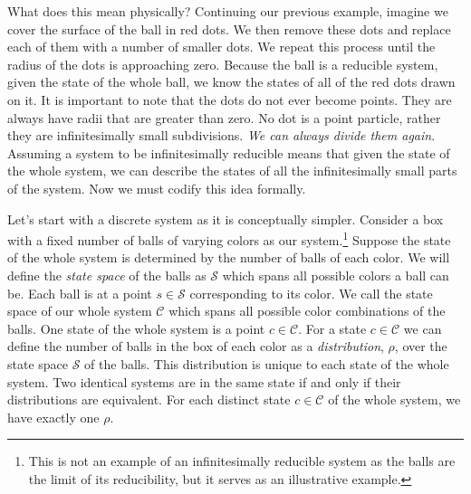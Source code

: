 \documentclass{article}
\begin{document}
	 What does this mean physically? Continuing our previous example, imagine we cover the surface of the ball in red dots. We then remove these dots and replace each of them with a number of smaller dots. We repeat this process until the radius of the dots is approaching zero. Because the ball is a reducible system, given the state of the whole ball, we know the states of all of the red dots drawn on it. It is important to note that the dots do not ever become points. They are always have radii that are greater than zero. No dot is a point particle, rather they are infinitesimally small subdivisions. \textit{We can always divide them again}. Assuming a system to be infinitesimally reducible means that given the state of the whole system, we can describe the states of all the infinitesimally small parts of the system. Now we must codify this idea formally.
	 	
	Let's start with a discrete system as it is conceptually simpler. Consider a box with a fixed number of balls of varying colors as our system.\footnote{This is not an example of an infinitesimally reducible system as the balls are the limit of its reducibility, but it serves as an illustrative example.} Suppose the state of the whole system is determined by the number of balls of each color. We will define the \textit{state space} of the balls as $\mathcal{S}$ which spans all possible colors a ball can be. Each ball is at a point $s \in \mathcal{S}$ corresponding to its color. We call the state space of our whole system $\mathcal{C}$ which spans all possible color combinations of the balls. One state of the whole system is a point $c \in \mathcal{C}$. For a state $c \in \mathcal{C}$ we can define the number of balls in the box of each color as a \textit{distribution}, $\rho$, over the state space $\mathcal{S}$ of the balls. This distribution is unique to each state of the whole system. Two identical systems are in the same state if and only if their distributions are equivalent. For each distinct state $c \in \mathcal{C}$ of the whole system, we have exactly one $\rho$. 

\end{document}
